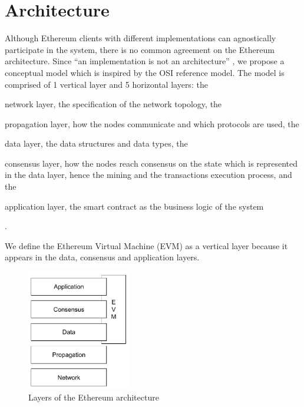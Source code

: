 \section{Architecture}
\label{sec:architecture}

Although Ethereum clients with different implementations can agnostically
participate in the system, there is no common agreement on the Ethereum
architecture. Since ``an implementation is not an architecture''
\cite{bib:art-of-scalability}, we propose a conceptual model which is inspired
by the OSI reference model. The model is comprised of 1 vertical layer and 5
horizontal layers: the
\begin{enumerate*}[label=(\arabic*)]
  \item network layer, the specification of the network topology, the
  \item propagation layer, how the nodes communicate and which protocols
  are used, the
  \item data layer, the data structures and data types, the
  \item consensus layer, how the nodes reach consensus on the state which is
  represented in the data layer, hence the mining and the transactions execution
  process, and the
  \item application layer, the smart contract as the business logic of the
  system
\end{enumerate*}.

We define the Ethereum Virtual Machine (EVM) as a vertical layer because it
appears in the data, consensus and application layers.

\begin{figure}[H]
	\begin{center}
		\includegraphics[width=0.4\textwidth]{./res/img/architecture.pdf}
	\end{center}
	\caption{Layers of the Ethereum architecture}
	\label{fig:architecture}
\end{figure}

